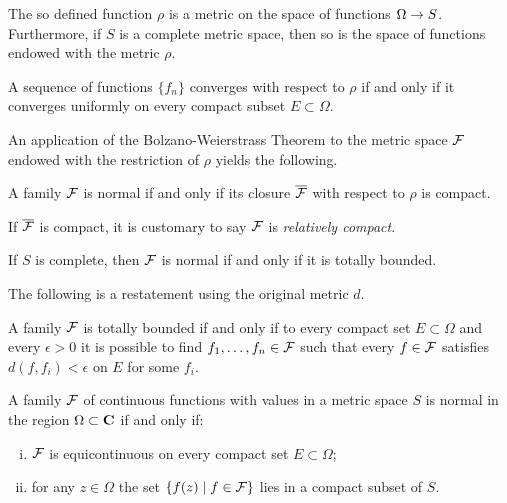 \begin{proposition}
  The so defined function $\rho$ is a metric on the space of functions $\Omega \rightarrow S$. Furthermore, if $S$ is a complete metric space, then so is the space of functions endowed with the metric $\rho$.
\end{proposition}

\begin{proposition}
   A sequence of functions $\{f_n\}$ converges with respect to $\rho$ if and only if it converges uniformly on every compact subset $E \subset \Omega$.
\end{proposition}
 
An application of the Bolzano-Weierstrass Theorem to the metric space $\mathcal{F}$ endowed with the restriction of $\rho$ yields the following.

\begin{theorem}
  A family $\mathcal{F}$ is normal if and only if its closure $\overline{\mathcal{F}}$ with respect to $\rho$ is compact.
\end{theorem}

If $\overline{\mathcal{F}}$ is compact, it is customary to say $\mathcal{F}$ is \emph{relatively compact}.

\begin{theorem}
  If $S$ is complete, then $\mathcal{F}$ is normal if and only if it is totally bounded.
\end{theorem}

The following is a restatement using the original metric $d$.

\begin{theorem}
  A family $\mathcal{F}$ is totally bounded if and only if to every compact set $E \subset \Omega$ and every $\epsilon > 0$ it is possible to find $f_1, \dots, f_n \in \mathcal{F}$ such that every $f \in \mathcal{F}$ satisfies $d(f,f_i) < \epsilon$ on $E$ for some $f_i$.
\end{theorem}

\begin{theorem}
  A family $\mathcal{F}$ of continuous functions with values in a metric space $S$ is normal in the region $\Omega \subset \mathbf{C}$ if and only if:
  \begin{enumerate}[(i)]
  \item $\mathcal{F}$ is equicontinuous on every compact set $E \subset \Omega$;
  \item for any $z \in \Omega$ the set $\{ f(z) \;|\; f \in \mathcal{F} \}$ lies in a compact subset of $S$.
  \end{enumerate}
\end{theorem}

